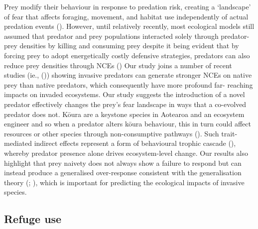 \documentclass[
  letterpaper,
  DIV=11,
  numbers=noendperiod]{scrartcl}
\begin{document}
Prey modify their behaviour in response to predation risk, creating a
`landscape' of fear that affects foraging, movement, and habitat use
independently of actual predation events
(). However, until
relatively recently, most ecological models still assumed that predator
and prey populations interacted solely through predator-prey densities
by killing and consuming prey despite it being evident that by forcing
prey to adopt energetically costly defensive strategies, predators can
also reduce prey densities through NCEs
() Our study joins
a number of recent studies (ie., ()) showing invasive predators can generate stronger NCEs on
native prey than native predators, which consequently have more profound
far- reaching impacts on invaded ecosystems. Our study suggests the
introduction of a novel predator effectively changes the prey's fear
landscape in ways that a co-evolved predator does not. Kōura are a
keystone species in Aotearoa and an ecosystem engineer and so when a
predator alters kōura behaviour, this in turn could affect resources or
other species through non-consumptive pathways
(). Such trait-mediated
indirect effects represent a form of behavioural trophic cascade
(), whereby predator
presence alone drives ecosystem-level change. Our results also highlight
that prey naivety does not always show a failure to respond but can
instead produce a generalised over-response consistent with the
generalisation theory (;
), which is important for
predicting the ecological impacts of invasive species.

\subsection{Refuge use}\label{refuge-use}
\end{document}
